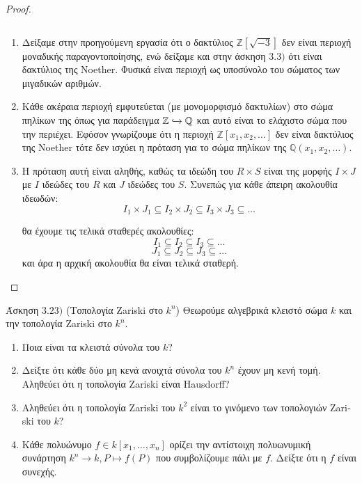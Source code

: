 \documentclass[oneside,a4paper]{article}
\newcommand {\tl}{\textlatin}
\newcommand{\Z}{\mathbb{Z}}
\newcommand{\Q}{\mathbb{Q}}
\begin{document}
\begin{proof} $ $
	
	$ $\newline
	\begin{enumerate}
		\item Δείξαμε στην προηγούμενη εργασία ότι ο δακτύλιος $\Z [\sqrt{-3}]$ δεν είναι περιοχή μοναδικής παραγοντοποίησης, ενώ δείξαμε και στην άσκηση $3.3)$ ότι είναι δακτύλιος της \tl{Noether}. Φυσικά είναι περιοχή ως υποσύνολο του σώματος των μιγαδικών αριθμών.
		\item Κάθε ακέραια περιοχή εμφυτεύεται (με μονομορφισμό δακτυλίων) στο σώμα πηλίκων της όπως για παράδειγμα $\Z \xhookrightarrow{} \Q$ και αυτό είναι το ελάχιστο σώμα που την περιέχει. Εφόσον γνωρίζουμε ότι η περιοχή $\Z [ x_1, x_2 ,\ldots ]$ δεν είναι δακτύλιος της \tl{Noether} τότε δεν ισχύει η πρόταση για το σώμα πηλίκων της $\Q (x_1,x_2,\ldots)$.
		\item Η πρόταση αυτή είναι αληθής, καθώς τα ιδεώδη του $R\times S$ είναι της μορφής $I\times J$ με $I$ ιδεώδες του $R$ και $J$ ιδεώδες του $S$. Συνεπώς για κάθε άπειρη ακολουθία ιδεωδών:
		$$I_1 \times J_1 \subseteq I_2 \times J_2 \subseteq I_3 \times J_3 \subseteq \ldots$$

		θα έχουμε τις τελικά σταθερές ακολουθίες:
		$$I_1 \subseteq I_2 \subseteq I_3 \subseteq \ldots $$
		$$J_1 \subseteq J_2 \subseteq J_3 \subseteq \ldots $$
		και άρα η αρχική ακολουθία θα είναι τελικά σταθερή.

	\end{enumerate}
	
\end{proof}

\pagebreak

\noindent Άσκηση $3.23)$ (Τοπολογία \tl{Zariski} στο $k^n$)
\quad Θεωρούμε αλγεβρικά κλειστό σώμα $k$ και την τοπολογία \tl{Zariski} στο $k^n$.
\begin{enumerate}
	\item Ποια είναι τα κλειστά σύνολα του $k$?
	\item Δείξτε ότι κάθε δύο μη κενά ανοιχτά σύνολα του $k^n$ έχουν μη κενή τομή. Αληθεύει ότι η τοπολογία \tl{Zariski} είναι \tl{Hausdorff}?
	\item Αληθεύει ότι η τοπολογία \tl{Zariski} του $k^2$ είναι το γινόμενο των τοπολογιών \tl{Zariski} του $k$?
	\item Κάθε πολυώνυμο $f \in k[x_1,\ldots, x_n]$ ορίζει την αντίστοιχη πολυωνυμική συνάρτηση $k^n \rightarrow k, P \mapsto f(P)$ που συμβολίζουμε πάλι με $f$. Δείξτε ότι η $f$ είναι συνεχής.
\end{enumerate}
\end{document}
